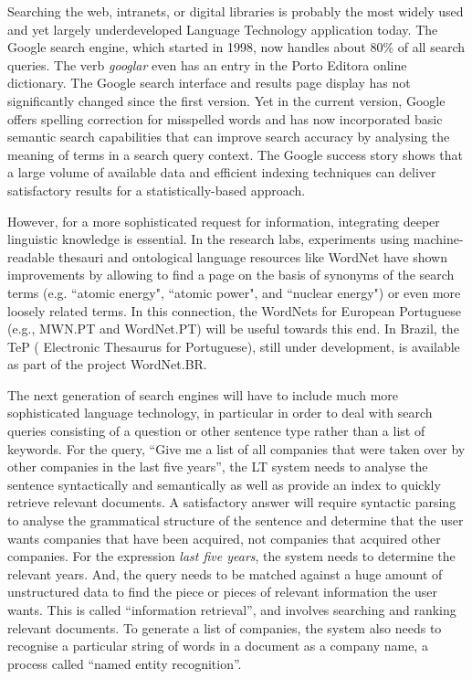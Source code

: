 \documentclass[]{../metanetpaper}
\begin{document}
\begin{multicols}{2}
  Searching the web, intranets, or digital libraries is probably the most widely used and yet largely underdeveloped Language Technology application today. The Google search engine, which started in 1998, now handles about 80\% of all search queries\cite{spi1}. The verb \textit{googlar} even has an entry in the Porto E\-di\-to\-ra online dictionary. The Google search interface and results page display has not significantly changed since the first version. Yet in the current version, Google offers spelling correction for misspelled words and  has now incorporated basic semantic search capabilities that can improve search accuracy by analysing the meaning of terms in a search query context\cite{pc1}. The Google success story shows that a large volume of available data and efficient indexing techniques can deliver satisfactory results for a statistically-based approach.   


 However, for a more sophisticated request for information, integrating deeper linguistic knowledge is essential. In the research labs, experiments using machine-readable thesauri and ontological language resources like WordNet have shown improvements by allowing to find a page on the basis of synonyms of the search terms (e.g. “atomic energy", “atomic power", and “nuclear energy") or even more loosely related terms. In this connection, the WordNets for European Portuguese (e.g., MWN.PT and WordNet.PT) will be useful towards this end. In Brazil, the TeP ( Electronic Thesaurus for Portuguese), still under development, is available as part of the project WordNet.BR.

The next generation of search engines will have to include much more sophisticated language technology, in particular in order to deal with search queries consisting of a question or other sentence type rather than a list of keywords. For the query, “Give me a list of all companies that were taken over by other companies in the last five years”, the LT system needs to analyse the sentence syntactically and semantically as well as provide an index to quickly retrieve relevant documents. A satisfactory answer will require syntactic parsing to analyse the grammatical structure of the sentence and determine that the user wants companies that have been acquired, not companies that acquired other companies. For the expression \textit{last five years}, the system needs to determine the relevant years. And, the query needs to be matched against a huge amount of unstructured data to find the piece or pieces of relevant information the user wants. This is called “information retrieval”, and involves searching and ranking relevant documents. To generate a list of companies, the system also needs to recognise a particular string of words in a document as a company name, a process called “named entity recognition”.


\end{multicols}
\end{document}

